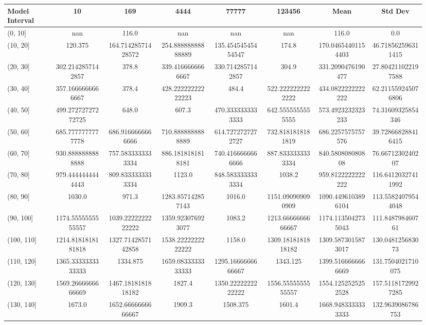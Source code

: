 \begin{table}[H]
\centering
\begin{tabular}{|l |c |c |c |c |c |c |c|}
\hline
Model Interval & 10 & 169 & 4444 & 77777 & 123456 & Mean & Std Dev \\
\hline
(0, 10] & nan & 116.0 & nan & nan & nan & 116.0 & 0.0 \\
(10, 20] & 120.375 & 164.71428571428572 & 254.88888888888889 & 135.45454545454547 & 174.8 & 170.04654401154403 & 46.718562596311415 \\
(20, 30] & 302.2142857142857 & 378.8 & 339.4166666666667 & 330.7142857142857 & 304.9 & 331.2090476190477 & 27.804211022197588 \\
(30, 40] & 357.1666666666667 & 378.4 & 428.22222222222223 & 484.4 & 522.2222222222222 & 434.0822222222222 & 62.211559245076806 \\
(40, 50] & 499.27272727272725 & 648.0 & 607.3 & 470.3333333333333 & 642.5555555555555 & 573.4923232323233 & 74.31609325854346 \\
(50, 60] & 685.7777777777778 & 686.9166666666666 & 710.8888888888889 & 614.7272727272727 & 732.8181818181819 & 686.2257575757576 & 39.728668288416415 \\
(60, 70] & 930.8888888888888 & 757.5833333333334 & 886.1818181818181 & 740.4166666666666 & 887.8333333333334 & 840.580808080808 & 76.6671230240207 \\
(70, 80] & 979.4444444444443 & 809.8333333333334 & 1123.0 & 848.5833333333334 & 1038.2 & 959.8122222222222 & 116.64120327411992 \\
(80, 90] & 1030.0 & 971.3 & 1283.857142857143 & 1016.0 & 1151.090909090909 & 1090.4496103896104 & 113.55824079544048 \\
(90, 100] & 1174.5555555555557 & 1039.2222222222222 & 1359.923076923077 & 1083.2 & 1213.6666666666667 & 1174.1135042735043 & 111.848798460761 \\
(100, 110] & 1214.8181818181818 & 1327.7142857142858 & 1538.2222222222222 & 1158.0 & 1309.1818181818182 & 1309.5873015873017 & 130.048125683073 \\
(110, 120] & 1365.3333333333333 & 1334.875 & 1659.0833333333333 & 1295.1666666666667 & 1343.125 & 1399.5166666666669 & 131.7504021710075 \\
(120, 130] & 1569.2666666666669 & 1467.1818181818182 & 1827.4 & 1350.2222222222222 & 1556.5555555555557 & 1554.1252525252528 & 157.51181729927285 \\
(130, 140] & 1673.0 & 1652.6666666666667 & 1909.3 & 1508.375 & 1601.4 & 1668.9483333333333 & 132.9639086786753 \\

\end{tabular}
\end{table}
